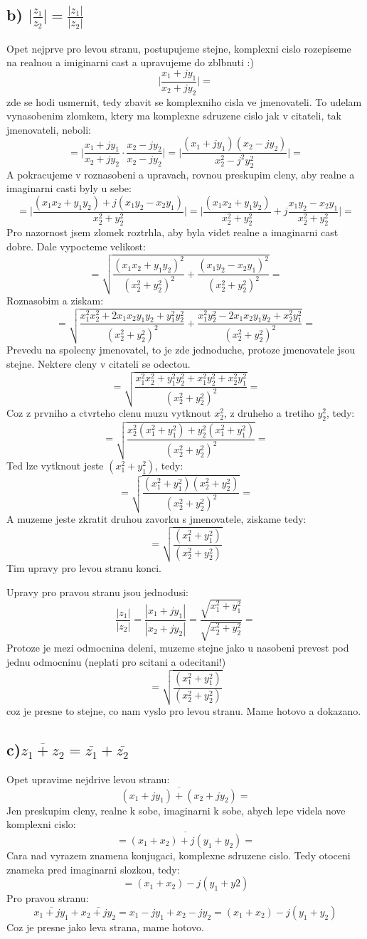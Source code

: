 \subsection*{b) $\lvert \frac{z_1}{z_2} \rvert = \frac{|z_1|}{|z_2|}$}
Opet nejprve pro levou stranu, postupujeme stejne, komplexni cislo rozepiseme na realnou a imiginarni cast a upravujeme do zblbnuti :)
$$\lvert \frac{x_1 + j y_1}{x_2 +j y_2} \rvert = $$
zde se hodi usmernit, tedy zbavit se komplexniho cisla ve jmenovateli. To udelam vynasobenim zlomkem, ktery ma komplexne sdruzene cislo jak v citateli, tak jmenovateli, neboli:
$$ = \lvert \frac{x_1 + j y_1}{x_2 +j y_2} \cdot \frac{x_2 -j y_2}{x_2 -j y_2} \rvert = \lvert \frac{(x_1 + j y_1)(x_2 -j y_2)}{x_2^2 - j^2 y_2^2} \rvert =$$
A pokracujeme v roznasobeni a upravach, rovnou preskupim cleny, aby realne a imaginarni casti byly u sebe:
$$= \lvert \frac{(x_1 x_2+y_1 y_2)+j(x_1 y_2 - x_2 y_1)}{x_2^2 + y_2^2} \rvert= \lvert \frac{(x_1 x_2+y_1 y_2)}{x_2^2 + y_2^2}+j \frac{x_1 y_2 - x_2 y_1}{x_2^2 + y_2^2} \rvert = $$
Pro nazornost jsem zlomek roztrhla, aby byla videt realne a imaginarni cast dobre. Dale vypocteme velikost:
$$=\sqrt{\frac{(x_1 x_2+y_1 y_2)^2}{(x_2^2 + y_2^2)^2}+\frac{(x_1 y_2 - x_2 y_1)^2}{(x_2^2 + y_2^2)^2}} = $$
Roznasobim a ziskam:
$$= \sqrt{\frac{x_1^2 x_2^2 +2 x_1 x_2 y_1 y_2 + y_1^2 y_2^2}{(x_2^2 + y_2^2)^2}+\frac{x_1^2 y_2^2 -2 x_1 x_2 y_1 y_2 +x_2^2 y_1^2}{(x_2^2 + y_2^2)^2}}=$$
Prevedu na spolecny jmenovatel, to je zde jednoduche, protoze jmenovatele jsou stejne. Nektere cleny v citateli se odectou.
$$=\sqrt{\frac{x_1^2 x_2^2 +y_1^2 y_2^2 + x_1^2 y_2^2 + x_2^2 y_1^2}{(x_2^2 + y_2^2)^2}}=$$
Coz z prvniho a ctvrteho clenu muzu vytknout $x_2^2$, z druheho a tretiho $y_2^2$, tedy:
$$=\sqrt{\frac{x_2^2(x_1^2 +y_1^2)+y_2^2(x_1^2+y_1^2)}{(x_2^2 + y_2^2)^2}}=$$
Ted lze vytknout jeste $(x_1^2+y_1^2)$, tedy:
$$=\sqrt{\frac{(x_1^2+y_1^2)(x_2^2+y_2^2)}{(x_2^2 + y_2^2)^2}}=$$
A muzeme jeste zkratit druhou zavorku s jmenovatele, ziskame tedy:
$$=\sqrt{\frac{(x_1^2+y_1^2)}{(x_2^2 + y_2^2)}}$$
Tim upravy pro levou stranu konci.

Upravy pro pravou stranu jsou jednodusi:
$$\frac{|z_1|}{|z_2|}=\frac{|x_1+j y_1|}{|x_2+j y_2|} = \frac{\sqrt{x_1^2+y_1^2}}{\sqrt{x_2^2+y_2^2}} = $$
Protoze je mezi odmocnina deleni, muzeme stejne jako u nasobeni prevest pod jednu odmocninu (neplati pro scitani a odecitani!)
$$=\sqrt{\frac{(x_1^2+y_1^2)}{(x_2^2+y_2^2)}}$$
coz je presne to stejne, co nam vyslo pro levou stranu. Mame hotovo a dokazano.

\subsection*{c)$\overline{z_1+z_2} = \overline{z_1}+\overline{z_2}$}
Opet upravime nejdrive levou stranu:
$$\overline{(x_1+j y_1)+(x_2+j y_2)} =$$
Jen preskupim cleny, realne k sobe, imaginarni k sobe, abych lepe videla nove komplexni cislo:
$$=\overline{(x_1+x_2)+j(y_1+y_2)}=$$
Cara nad vyrazem znamena konjugaci, komplexne sdruzene cislo. Tedy otoceni znameka pred imaginarni slozkou, tedy:
$$=(x_1+x_2) - j(y_1+y2)$$
Pro pravou stranu:
$$\overline{x_1+jy_1}+\bar{x_2+jy_2} = x_1 - jy_1 + x_2 - jy_2 = (x_1+x_2)-j(y_1+y_2)$$
Coz je presne jako leva strana, mame hotovo.

